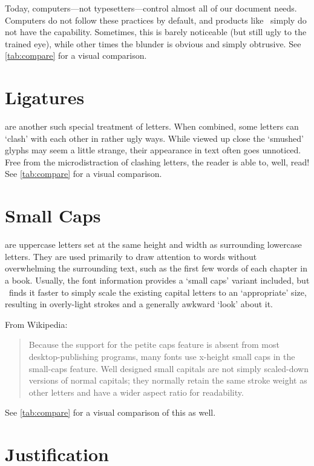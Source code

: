 \documentclass{article}
\begin{document}
Today, computers---not typesetters---control almost all of our document needs.
Computers do not follow these practices by default,
  and products like \MicrosoftWord\ simply do not have the capability.
Sometimes, this is barely noticeable (but still ugly to the trained eye),
  while other times the blunder is obvious and simply obtrusive.
See \autoref{tab:compare} for a visual comparison.



\section{Ligatures}
\label{sec:ligatures}

 are another such special treatment of letters.
When combined, some letters can `clash' with each other in rather ugly ways.
While viewed up close the `smushed' glyphs may seem a little strange,
  their appearance in text often goes unnoticed.
Free from the microdistraction of clashing letters,
  the reader is able to, well, read!
See \autoref{tab:compare} for a visual comparison.

\section{Small Caps}
\label{sec:small-caps}

 are uppercase letters set
  at the same height and width
  as surrounding lowercase letters.
They are used primarily to draw attention to words
  without overwhelming the surrounding text,
  such as the first few words of each chapter in a book.
Usually, the font information provides a `small caps' variant included,
  but \MicrosoftWord\ finds it faster to
  simply scale the existing capital letters
  to an `appropriate' size, resulting in overly-light strokes
  and a generally awkward `look' about it.

From Wikipedia:
\begin{quote}
  Because the support for the petite caps feature
    is absent from most desktop-publishing programs,
    many fonts use x-height small caps in the small-caps feature.
  Well designed small capitals are
    not simply scaled-down versions of normal capitals;
    they normally retain the same stroke weight
    as other letters and have a wider aspect ratio for readability.
\end{quote}
See \autoref{tab:compare} for a visual comparison of this as well.

\section{Justification}
\label{sec:justification}
\end{document}
